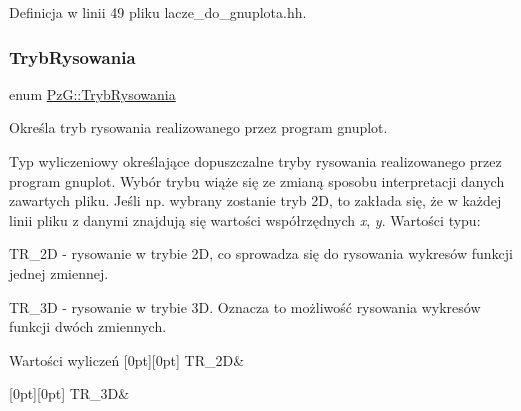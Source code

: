 Definicja w linii 49 pliku lacze\+\_\+do\+\_\+gnuplota.\+hh.

\mbox{\label{namespace_pz_g_aeedae1ef10c66d720f9e89de408ca4ca}} 
\subsubsection{\texorpdfstring{Tryb\+Rysowania}{TrybRysowania}}
{\footnotesize\ttfamily enum \hyperlink{namespace_pz_g_aeedae1ef10c66d720f9e89de408ca4ca}{Pz\+G\+::\+Tryb\+Rysowania}}



Określa tryb rysowania realizowanego przez program {\ttfamily gnuplot}. 

Typ wyliczeniowy określające dopuszczalne tryby rysowania realizowanego przez program {\ttfamily gnuplot}. Wybór trybu wiąże się ze zmianą sposobu interpretacji danych zawartych pliku. Jeśli np. wybrany zostanie tryb 2D, to zakłada się, że w każdej linii pliku z danymi znajdują się wartości współrzędnych {\itshape x}, {\itshape y}. Wartości typu\+: \begin{DoxyItemize}
\item {\ttfamily T\+R\+\_\+2D} -\/ rysowanie w trybie 2D, co sprowadza się do rysowania wykresów funkcji jednej zmiennej. \item {\ttfamily T\+R\+\_\+3D} -\/ rysowanie w trybie 3D. Oznacza to możliwość rysowania wykresów funkcji dwóch zmiennych. \end{DoxyItemize}
\begin{DoxyEnumFields}{Wartości wyliczeń}
[0pt][0pt]{}\mbox{\label{namespace_pz_g_aeedae1ef10c66d720f9e89de408ca4caa5eb0cf8b3405e136f092efdb489d60c4}} 
T\+R\+\_\+2D&\\
\hline

[0pt][0pt]{}\mbox{\label{namespace_pz_g_aeedae1ef10c66d720f9e89de408ca4caa856e6b0fa6b8a9dc184c60cf27dcc5d2}} 
T\+R\+\_\+3D&\\
\hline

\end{DoxyEnumFields}


